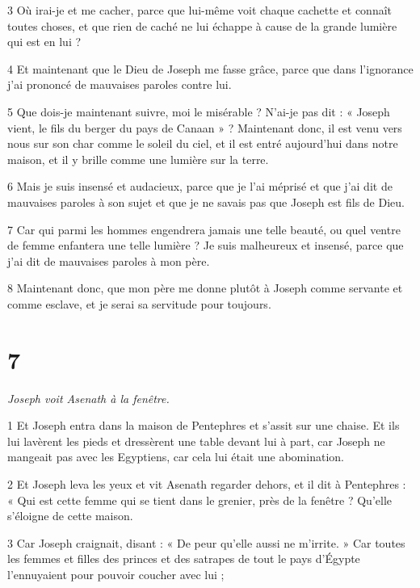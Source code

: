 \par 3 Où irai-je et me cacher, parce que lui-même voit chaque cachette et connaît toutes choses, et que rien de caché ne lui échappe à cause de la grande lumière qui est en lui ?

\par 4 Et maintenant que le Dieu de Joseph me fasse grâce, parce que dans l'ignorance j'ai prononcé de mauvaises paroles contre lui.

\par 5 Que dois-je maintenant suivre, moi le misérable ? N'ai-je pas dit : « Joseph vient, le fils du berger du pays de Canaan » ? Maintenant donc, il est venu vers nous sur son char comme le soleil du ciel, et il est entré aujourd'hui dans notre maison, et il y brille comme une lumière sur la terre.

\par 6 Mais je suis insensé et audacieux, parce que je l'ai méprisé et que j'ai dit de mauvaises paroles à son sujet et que je ne savais pas que Joseph est fils de Dieu.

\par 7 Car qui parmi les hommes engendrera jamais une telle beauté, ou quel ventre de femme enfantera une telle lumière ? Je suis malheureux et insensé, parce que j'ai dit de mauvaises paroles à mon père.

\par 8 Maintenant donc, que mon père me donne plutôt à Joseph comme servante et comme esclave, et je serai sa servitude pour toujours.

\chapter{7}

\par \textit{Joseph voit Asenath à la fenêtre.}

\par 1 Et Joseph entra dans la maison de Pentephres et s'assit sur une chaise. Et ils lui lavèrent les pieds et dressèrent une table devant lui à part, car Joseph ne mangeait pas avec les Egyptiens, car cela lui était une abomination.

\par 2 Et Joseph leva les yeux et vit Asenath regarder dehors, et il dit à Pentephres : « Qui est cette femme qui se tient dans le grenier, près de la fenêtre ? Qu'elle s'éloigne de cette maison.

\par 3 Car Joseph craignait, disant : « De peur qu'elle aussi ne m'irrite. » Car toutes les femmes et filles des princes et des satrapes de tout le pays d'Égypte l'ennuyaient pour pouvoir coucher avec lui ;

